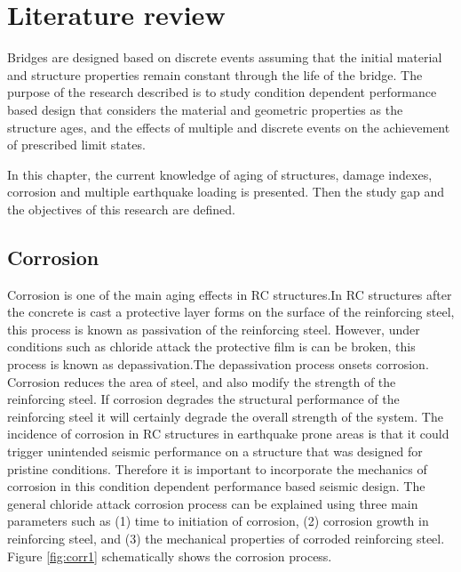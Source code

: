 \chapter{Literature review}
\label{chap-two}
Bridges are designed based on discrete events assuming that the initial material and structure properties remain constant through the life of the bridge. The purpose of the research described is to study condition dependent performance based design that considers the material and geometric properties as the structure ages, and the effects of multiple and discrete events on the achievement of prescribed limit states.

In this chapter, the current knowledge of aging of structures, damage indexes, corrosion and multiple earthquake loading is presented. Then the study gap and the objectives of this research are defined.

\section{Corrosion}

Corrosion is one of the main aging effects in RC structures.In RC structures after the concrete is cast a protective layer forms on the surface of the reinforcing steel, this process is known as passivation of the reinforcing steel. However, under conditions such as chloride attack the protective film is can be broken, this process is known as depassivation.The depassivation process onsets corrosion. Corrosion reduces the area of steel, and also modify the strength of the reinforcing steel. If corrosion degrades the structural performance of the reinforcing steel it will certainly degrade the overall strength of the system. The incidence of corrosion in RC structures in earthquake prone areas is that it could trigger unintended seismic performance on a structure that was designed for pristine conditions. Therefore it is important to incorporate the  mechanics of corrosion in this condition dependent performance based seismic design. The general chloride attack corrosion process can be explained using three main parameters such as (1) time to initiation of corrosion, (2) corrosion growth in reinforcing steel, and (3) the mechanical properties of corroded reinforcing steel. Figure \ref{fig:corr1} schematically shows the corrosion process.

